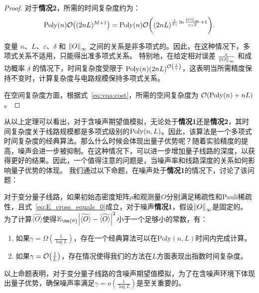 \begin{proof}
对于\textbf{情况2}，所需的时间复杂度约为：
\begin{equation}
  \mathrm{Poly}(n)\order{(2nL)^{M+1}}
  =
  \mathrm{Poly}(n)  \order{(2nL)^{\frac{1}{2\gamma} \ln{\frac{\norm{O}_\infty}{\varepsilon \sqrt{\delta}}}+1}}.
\end{equation}

变量 $n$、$L$、$\varepsilon$、$\delta$ 和 $\norm{O}_\infty$ 之间的关系是非多项式的。因此，在这种情况下，多项式关系不适用，只能得出准多项式关系。
特别地，在给定相对误差 $\frac{\varepsilon}{\norm{O}_\infty}$ 和成功概率 $\delta$ 的情况下，时间复杂度受限于 $\mathrm{Poly}(n)  (2nL)^{\order{\frac{1}{\gamma}}}$，这表明当所需精度保持不变时，计算复杂度与电路规模保持多项式关系。

在空间复杂度方面，根据式~\eqref{eq:vqa:cost}，所需的空间复杂度为 $\order{\mathrm{Poly}(n)+nL}$。
\end{proof}

\begin{remark}
    从以上定理可以看出，对于含噪声期望值模拟，无论处于\textbf{情况1}还是\textbf{情况2}，其时间复杂度关于线路规模都是多项式级别的$\text{Poly}(n,L)$。因此，该算法是一个多项式时间复杂度的经典算法。那么什么时候会体现出量子优势呢？随着实验精度的提高，噪声会进一步被抑制。在这种情况下，可以进一步增加量子线路的深度，以获得更好的结果。因此，一个值得注意的问题是，当噪声率和线路深度的关系如何影响量子优势的体现。
    我们通过以下命题，在噪声处于\textbf{情况1}的情况下，讨论了该问题：
\end{remark}
\begin{proposition}
    \label{prop:lambda_and_L}
    对于变分量子线路，如果初始态密度矩阵$\rho$和观测量$O$分别满足稀疏性和Pauli稀疏性，且式~\eqref{eq:E_cross_equals_0}成立，对于噪声\textbf{情况1}，假设$\norm{O}_\infty$是固定的。
    为了计算$\widehat{\langle O\rangle}$使得$\mathbb{E}_{\bm{\theta}}\abs{\widetilde{\langle O\rangle}-\widehat{\langle O\rangle}}^2$小于一个足够小的常数，有：
    \begin{enumerate}
        \item 如果$\gamma=\Omega(\frac{1}{\log{L}})$，存在一个经典算法可以在$\mathrm{Poly}\left(n,L\right)$时间内完成计算。
        \item 如果$\gamma=\order{\frac{1}{L}}$，存在情况使得我们的方法在$L$方面表现出指数时间复杂度。
    \end{enumerate}
\end{proposition}
以上命题表明，对于变分量子线路的含噪声期望值模拟，为了在含噪声环境下体现出量子优势，确保噪声率满足$\gamma=o(\frac{1}{\log{L}})$是至关重要的。

